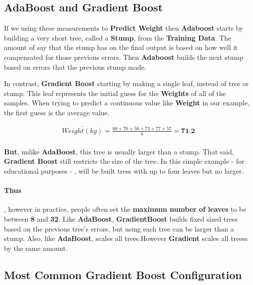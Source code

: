 \documentclass[12pt, a4paper]{article} %
\begin{document}
\subsection{AdaBoost and Gradient Boost}

If we using these measurements to \textbf{Predict Weight} then \textbf{Adaboost} starts by building a very short tree, called a \textbf{Stump}, from the \textbf{Training Data}. The amount of say that the stump has on the final output is based on how well it compensated for those previous errors. Then \textbf{Adaboost} builds the next stump based on errors that the previous stump made.

\newline

In contrast, \textbf{Gradient Boost} starting by making a single leaf, instead of tree or stump. This leaf represents the initial guess for the \textbf{Weights} of all of the samples. When trying to predict a continuous value like \textbf{Weight} in our example, the first guess is the average value.

\begin{align*}
    \overline{Weight(kg)} = \frac{88 + 76 + 56 + 73 + 77 + 57}{6} = \textbf{71.2}\\
\end{align*}

\textbf{But}, unlike \textbf{AdaBoost}, this tree is usually larger than a stump.
That said, \textbf{Gradient Boost} still restricts the size of the tree. In this simple example - for educational purposes - , will be built tress with up to four leaves but no larger.

\paragraph{Thus}, however in practice, people often set the \textbf{maximum number of leaves} to be between \textbf{8} and \textbf{32}. Like \textbf{AdaBoost}, \textbf{GradientBoost} builds fixed sized trees based on the previous tree's errors, but using  each tree can be larger than a stump. Also, like \textbf{AdaBoost},  scales all trees.However \textbf{Gradient} scales all treess by the same amount.

     
     
\subsection{Most Common Gradient Boost Configuration}
\end{document}
